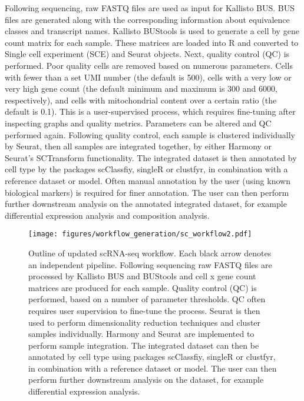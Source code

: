 Following sequencing, raw FASTQ files are used as input for Kallisto BUS.
BUS files are generated along with the corresponding information about equivalence classes and transcript names.
Kallisto BUStools is used to generate a cell by gene count matrix for each sample.
These matrices are loaded into R and converted to Single cell experiment (SCE) and Seurat objects.
Next, quality control (QC) is performed.
Poor quality cells are removed based on numerous parameters.
Cells with fewer than a set UMI number (the default is 500), cells with a very low or very high gene count (the default minimum and maximum is 300 and 6000, respectively), and cells with mitochondrial content over a certain ratio (the default is 0.1).
This is a user-supervised process, which requires fine-tuning after inspecting graphs and quality metrics.
Parameters can be altered and QC performed again.
Following quality control, each sample is clustered individually by Seurat, then all samples are integrated together, by either Harmony or Seurat's SCTransform functionality.
The integrated dataset is then annotated by cell type by the packages scClassfiy, singleR or clustfyr, in combination with a reference dataset or model.
Often manual annotation by the user (using known biological markers) is required for finer annotation.
The user can then perform further downstream analysis on the annotated integrated dataset, for example differential expression analysis and composition analysis.

\begin{figure}[hp]
\centering
\texttt{[image: figures/workflow\_generation/sc\_workflow2.pdf]}
\caption[Updated scRNA-seq workflow]{Outline of updated scRNA-seq workflow.
Each black arrow denotes an independent pipeline.
Following sequencing raw FASTQ files are processed by Kallisto BUS and BUStools and cell x gene count matrices are produced for each sample.
Quality control (QC) is performed, based on a number of parameter thresholds.
QC often requires user supervision to fine-tune the process.
Seurat is then used to perform dimensionality reduction techniques and cluster samples individually.
Harmony and Seurat are implemented to perform sample integration.
The integrated dataset can then be annotated by cell type using packages scClassfiy, singleR or clustfyr, in combination with a reference dataset or model.
The user can then perform further downstream analysis on the dataset, for example differential expression analysis.
}
\label{fig:updated_sc_workflow}
\end{figure}


